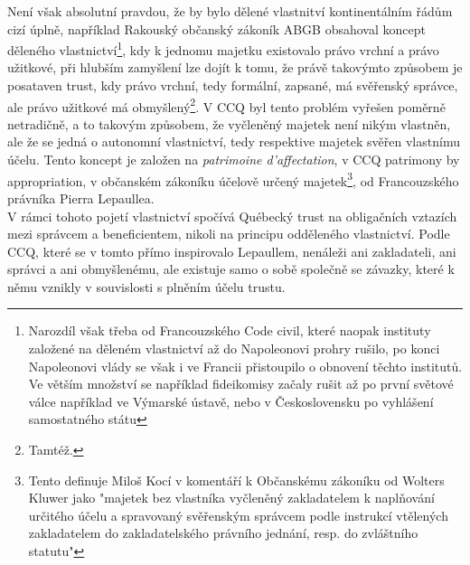 \documentclass{article}
\begin{document}
Není však absolutní pravdou, že by bylo dělené vlastnitví kontinentálním řádům cizí úplně, například Rakouský občanský zákoník ABGB obsahoval koncept děleného vlastnictví\footnote{Narozdíl však třeba od Francouzského Code civil, které naopak instituty založené na děleném vlastnictví až do Napoleonovi prohry rušilo, po konci Napoleonovi vlády se však i ve Francii přistoupilo o obnovení těchto institutů. Ve větším množství se například fideikomisy začaly rušit až po první světové válce například ve Výmarské ústavě, nebo v Československu po vyhlášení samostatného státu}, kdy k jednomu majetku existovalo právo vrchní a právo užitkové, při hlubším zamyšlení lze dojít k tomu, že právě takovýmto způsobem je posataven trust, kdy právo vrchní, tedy formální, zapsané, má svěřenský správce, ale právo užitkové má obmyšlený\footnote{Tamtéž.}. V CCQ byl tento problém vyřešen poměrně netradičně, a to takovým způsobem, že vyčleněný majetek není nikým vlastněn, ale že se jedná o autonomní vlastnictví, tedy respektive majetek svěřen vlastnímu účelu. Tento koncept je založen na \textit{patrimoine d'affectation}, v CCQ patrimony by appropriation, v občanském zákoníku účelově určený majetek\footnote{Tento definuje Miloš Kocí v komentáří k Občanskému zákoníku od Wolters Kluwer jako "majetek bez vlastníka vyčleněný zakladatelem k naplňování určitého účelu a spravovaný svěřenským správcem podle instrukcí vtělených zakladatelem do zakladatelského právního jednání, resp. do zvláštního statutu"}, od Francouzského právníka Pierra Lepaullea.\\ 

V rámci tohoto pojetí vlastnictví spočívá Québecký trust na obligačních vztazích mezi správcem a beneficientem, nikoli na principu odděleného vlastnictví. Podle CCQ, které se v tomto přímo inspirovalo Lepaullem, nenáleži ani zakladateli, ani správci a ani obmyšlenému, ale existuje samo o sobě společně se závazky, které k němu vznikly v souvislosti s plněním účelu trustu.\\
\end{document}
